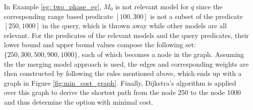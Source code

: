 \begin{example}
In Example \ref{eg: two_phase_eg}, $M_0$ is not relevant model for $q$ since the corresponding range based predicate $[100, 300]$ is not a subset of the predicate $[250, 1000]$ in the query, which is thrown away while other models are all relevant. For the predicates of the relevant models and the query predicates, their lower bound and upper bound values compose the following set: $\{250, 300, 500, 900, 1000\}$, each of which becomes a node in the graph. Assuming the the merging model approach is used, the edges and corresponding weights are then constructed by following the rules mentioned above, which ends up with a graph in Figure \ref{fig:min_cost_graph}. Finally, Dijkstra's algorithm is applied over this graph to derive the shortest path from the node 250 to the node 1000 and thus determine the option with minimal cost.





\end{example}
